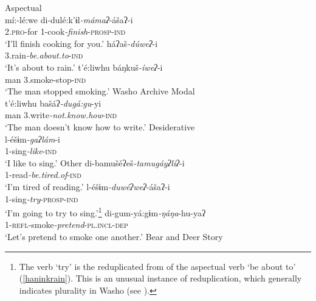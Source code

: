 \documentclass[output=paper]{langscibook}
\begin{document}
\ea Aspectual\label{haninkaspect}\\
\ex mí:-lé:we di-dulé:k'ɨl\textit{-mámaʔ}-ášaʔ-i\\
2.{\scshape pro}-for 1-cook\textit{-finish}-{\scshape prosp-ind}\\
\glt `I'll finish cooking for you.' 
\ex \gll háʔaš\textit{-dúweʔ}-i\\
3.rain\textit{-be.about.to}-{\scshape ind}\\
\glt `It's about to rain.'\label{haninkrain}
\ex \label{haninksmoke}\gll t'é:liwhu báŋkuš\textit{-íweʔ}-i\\
 man 3.smoke-stop-{\scshape ind}\\
\glt `The man stopped smoking.' \hfill Washo Archive
\z
\ex Modal\\
{\gll t'é:liwhu bašáʔ\textit{-dugá:gu}-yi\\
 man 3.write\textit{-not.know.how}-{\scshape ind}\\
\glt `The man doesn't know how to write.'} \label{haninkmodal}
\ex Desiderative\label{haninkwant}\\
\ex  \gll l-éšɨm\textit{-gaʔlám}-i\\
1-sing\textit{-like}-{\scshape ind}\\
\glt `I like to sing.'
\z 
\ex Other\label{haninkother} 
\ea \gll di-bamušéʔeš\textit{-tamugáyʔliʔ}-i\\
1-read\textit{-be.tired.of}-{\scshape ind}\\
\glt `I'm tired of reading.'
\ex \gll l-éšɨm\textit{-duwéʔweʔ}-ášaʔ-i\\
1-sing\textit{-try}-{\scshape prosp-ind}\\
\glt `I'm going to try to sing.'\footnote{The verb `try' is the reduplicated from of the aspectual verb `be about to' (\ref{haninkrain}). This is an unusual instance of reduplication, which generally indicates plurality in Washo (see \citealt{yu2005,yu2012}).}
\ex \gll di-gum-yá:gɨm\textit{-ŋáŋa}-hu-yaʔ\\
1-{\scshape refl}-smoke\textit{-pretend}-{\scshape pl.incl-dep}\\
\glt `Let's pretend to smoke one another.' \hfill Bear and Deer Story
\z 
\z 
\end{document}
